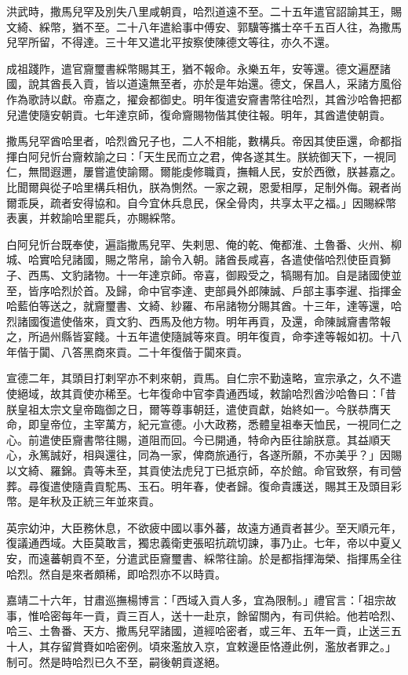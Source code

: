 \begin{pinyinscope}
洪武時，撒馬兒罕及別失八里咸朝貢，哈烈道遠不至。二十五年遣官詔諭其王，賜文綺、綵幣，猶不至。二十八年遣給事中傅安、郭驥等攜士卒千五百人往，為撒馬兒罕所留，不得達。三十年又遣北平按察使陳德文等往，亦久不還。

成祖踐阼，遣官齎璽書綵幣賜其王，猶不報命。永樂五年，安等還。德文遍歷諸國，說其酋長入貢，皆以道遠無至者，亦於是年始還。德文，保昌人，采諸方風俗作為歌詩以獻。帝嘉之，擢僉都御史。明年復遣安齎書幣往哈烈，其酋沙哈魯把都兒遣使隨安朝貢。七年達京師，復命齎賜物偕其使往報。明年，其酋遣使朝貢。

撒馬兒罕酋哈里者，哈烈酋兄子也，二人不相能，數構兵。帝因其使臣還，命都指揮白阿兒忻台齎敕諭之曰：「天生民而立之君，俾各遂其生。朕統御天下，一視同仁，無間遐邇，屢嘗遣使諭爾。爾能虔修職貢，撫輯人民，安於西徼，朕甚嘉之。比聞爾與從子哈里構兵相仇，朕為惻然。一家之親，恩愛相厚，足制外侮。親者尚爾乖戾，疏者安得協和。自今宜休兵息民，保全骨肉，共享太平之福。」因賜綵幣表裏，并敕諭哈里罷兵，亦賜綵幣。

白阿兒忻台既奉使，遍詣撒馬兒罕、失剌思、俺的乾、俺都淮、土魯番、火州、柳城、哈實哈兒諸國，賜之幣帛，諭令入朝。諸酋長咸喜，各遣使偕哈烈使臣貢獅子、西馬、文豹諸物。十一年達京師。帝喜，御殿受之，犒賜有加。自是諸國使並至，皆序哈烈於首。及歸，命中官李達、吏部員外郎陳誠、戶部主事李暹、指揮金哈藍伯等送之，就齎璽書、文綺、紗羅、布帛諸物分賜其酋。十三年，達等還，哈烈諸國復遣使偕來，貢文豹、西馬及他方物。明年再貢，及還，命陳誠齎書幣報之，所過州縣皆宴餞。十五年遣使隨誠等來貢。明年復貢，命李達等報如初。十八年偕于闐、八答黑商來貢。二十年復偕于闐來貢。

宣德二年，其頭目打剌罕亦不剌來朝，貢馬。自仁宗不勤遠略，宣宗承之，久不遣使絕域，故其貢使亦稀至。七年復命中官李貴通西域，敕諭哈烈酋沙哈魯曰：「昔朕皇祖太宗文皇帝臨御之日，爾等尊事朝廷，遣使貢獻，始終如一。今朕恭膺天命，即皇帝位，主宰萬方，紀元宣德。小大政務，悉體皇祖奉天恤民，一視同仁之心。前遣使臣齎書幣往賜，道阻而回。今已開通，特命內臣往諭朕意。其益順天心，永篤誠好，相與還往，同為一家，俾商旅通行，各遂所願，不亦美乎？」因賜以文綺、羅錦。貴等未至，其貢使法虎兒丁已抵京師，卒於館。命官致祭，有司營葬。尋復遣使隨貴貢駝馬、玉石。明年春，使者歸。復命貴護送，賜其王及頭目彩幣。是年秋及正統三年並來貢。

英宗幼沖，大臣務休息，不欲疲中國以事外蕃，故遠方通貢者甚少。至天順元年，復議通西域。大臣莫敢言，獨忠義衛吏張昭抗疏切諫，事乃止。七年，帝以中夏乂安，而遠蕃朝貢不至，分遣武臣齎璽書、綵幣往諭。於是都指揮海榮、指揮馬全往哈烈。然自是來者頗稀，即哈烈亦不以時貢。

嘉靖二十六年，甘肅巡撫楊博言：「西域入貢人多，宜為限制。」禮官言：「祖宗故事，惟哈密每年一貢，貢三百人，送十一赴京，餘留關內，有司供給。他若哈烈、哈三、土魯番、天方、撒馬兒罕諸國，道經哈密者，或三年、五年一貢，止送三五十人，其存留賞賚如哈密例。頃來濫放入京，宜敕邊臣恪遵此例，濫放者罪之。」制可。然是時哈烈已久不至，嗣後朝貢遂絕。


\end{pinyinscope}
